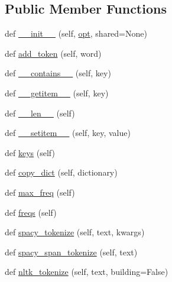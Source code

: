 \subsection*{Public Member Functions}
\begin{DoxyCompactItemize}
\item 
def \hyperlink{classparlai_1_1core_1_1dict_1_1DictionaryAgent_a324531500b43e0039f2c0087081a8b3d}{\+\_\+\+\_\+init\+\_\+\+\_\+} (self, \hyperlink{classparlai_1_1core_1_1dict_1_1DictionaryAgent_a6c0d7c9c31b38e99b747be88395d689f}{opt}, shared=None)
\item 
def \hyperlink{classparlai_1_1core_1_1dict_1_1DictionaryAgent_aec44508e4b501214618e24d86a4a51df}{add\+\_\+token} (self, word)
\item 
def \hyperlink{classparlai_1_1core_1_1dict_1_1DictionaryAgent_a29f4181dcdd5f53103bc342bf5f3c74a}{\+\_\+\+\_\+contains\+\_\+\+\_\+} (self, key)
\item 
def \hyperlink{classparlai_1_1core_1_1dict_1_1DictionaryAgent_a82a64989f1750412b6ffd9a4270953b3}{\+\_\+\+\_\+getitem\+\_\+\+\_\+} (self, key)
\item 
def \hyperlink{classparlai_1_1core_1_1dict_1_1DictionaryAgent_a1c686bb8b03cf09dbd43943d268c2410}{\+\_\+\+\_\+len\+\_\+\+\_\+} (self)
\item 
def \hyperlink{classparlai_1_1core_1_1dict_1_1DictionaryAgent_a43dfd6220ded966731b62bca37333dec}{\+\_\+\+\_\+setitem\+\_\+\+\_\+} (self, key, value)
\item 
def \hyperlink{classparlai_1_1core_1_1dict_1_1DictionaryAgent_ad5abcf174648d88f2383cba7a361dd29}{keys} (self)
\item 
def \hyperlink{classparlai_1_1core_1_1dict_1_1DictionaryAgent_a84faa359351d8b3edfb333e3b5f5ed71}{copy\+\_\+dict} (self, dictionary)
\item 
def \hyperlink{classparlai_1_1core_1_1dict_1_1DictionaryAgent_a3c3ef6181e0cea58b2650af763db1d17}{max\+\_\+freq} (self)
\item 
def \hyperlink{classparlai_1_1core_1_1dict_1_1DictionaryAgent_a72cfec62b2d5117326f514edfe848a1e}{freqs} (self)
\item 
def \hyperlink{classparlai_1_1core_1_1dict_1_1DictionaryAgent_a8e818ad5e11ecb08de6c4b858b2e68f1}{spacy\+\_\+tokenize} (self, text, kwargs)
\item 
def \hyperlink{classparlai_1_1core_1_1dict_1_1DictionaryAgent_a6532e92a69be5a68d04963597cd4ba29}{spacy\+\_\+span\+\_\+tokenize} (self, text)
\item 
def \hyperlink{classparlai_1_1core_1_1dict_1_1DictionaryAgent_a73fe72e257ace6e8debf2c41995f8390}{nltk\+\_\+tokenize} (self, text, building=False)

\end{DoxyCompactItemize}
